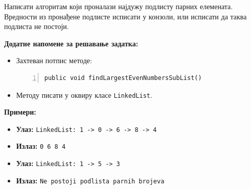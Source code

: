 Написати алгоритам који проналази најдужу подлисту парних елемената. Вредности из пронађене подлисте исписати у конзоли, или исписати да таква подлиста не постоји.

\textbf{Додатне напомене за решавање задатка:}
\begin{itemize}
	\item Захтеван потпис методе:
	\begin{Verbatim}[fontsize=\footnotesize, numbers=left, xleftmargin=10mm]
public void findLargestEvenNumbersSubList()
	\end{Verbatim}
	\item Методу писати у оквиру класе \texttt{LinkedList}.
\end{itemize}

\textbf{Примери:}
\begin{itemize}
	\item \textbf{Улаз:} \texttt{LinkedList: 1 -> 0 -> 6 -> 8 -> 4}
	\item \textbf{Излаз:} \texttt{0 6 8 4}
	\item \textbf{Улаз:} \texttt{LinkedList: 1 -> 5 -> 3}
	\item \textbf{Излаз:} \texttt{Ne postoji podlista parnih brojeva}
\end{itemize}




